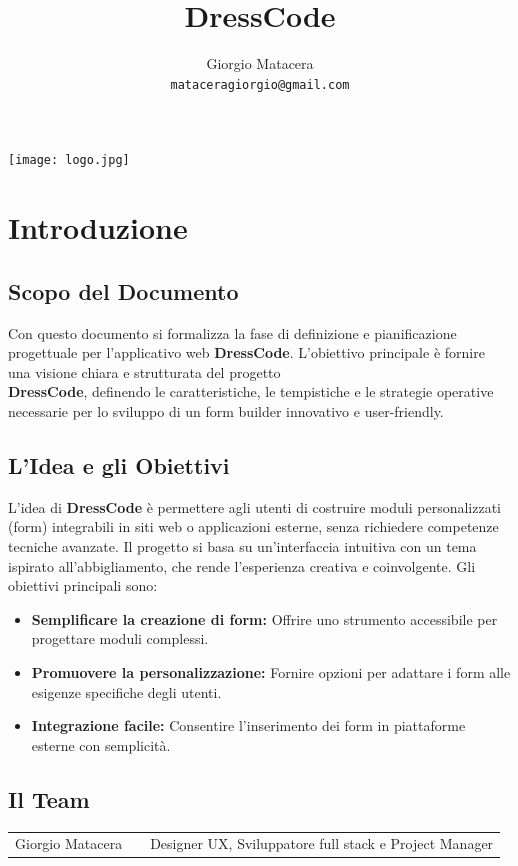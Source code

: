 \documentclass[11pt]{article}
\author{
Giorgio Matacera\\
\texttt{mataceragiorgio@gmail.com}
}
\title{\huge DressCode}
\date{\vspace{-5ex}}
\begin{document}
\maketitle
\begin{center}
    \texttt{[image: logo.jpg]}
\end{center}
\clearpage
{ \hypersetup{hidelinks} \tableofcontents }
\clearpage

\section{\huge Introduzione}
\subsection{Scopo del Documento}
Con questo documento si formalizza la fase di definizione e pianificazione progettuale per l'applicativo web \textbf{DressCode}. L'obiettivo principale è fornire una visione chiara e strutturata del progetto\\ \textbf{DressCode}, definendo le caratteristiche, le tempistiche e le strategie operative necessarie per lo sviluppo di un form builder innovativo e user-friendly.

\subsection{L'Idea e gli Obiettivi}
L'idea di \textbf{DressCode} è permettere agli utenti di costruire moduli personalizzati (form) integrabili in siti web o applicazioni esterne, senza richiedere competenze tecniche avanzate. Il progetto si basa su un'interfaccia intuitiva con un tema ispirato all'abbigliamento, che rende l'esperienza creativa e coinvolgente. Gli obiettivi principali sono:
\begin{itemize}
    \item[] \textbf{Semplificare la creazione di form:} Offrire uno strumento accessibile per progettare moduli complessi.
    \item[] \textbf{Promuovere la personalizzazione:} Fornire opzioni per adattare i form alle esigenze specifiche degli utenti.
    \item[] \textbf{Integrazione facile:} Consentire l'inserimento dei form in piattaforme esterne con semplicità.
\end{itemize}

\subsection{Il Team}
\ttfamily\large\begin{tabularx}{\linewidth}{lXr}
    Giorgio Matacera & & Designer UX, Sviluppatore full stack e Project Manager\\
\end{tabularx}
\rmfamily
\end{document}
